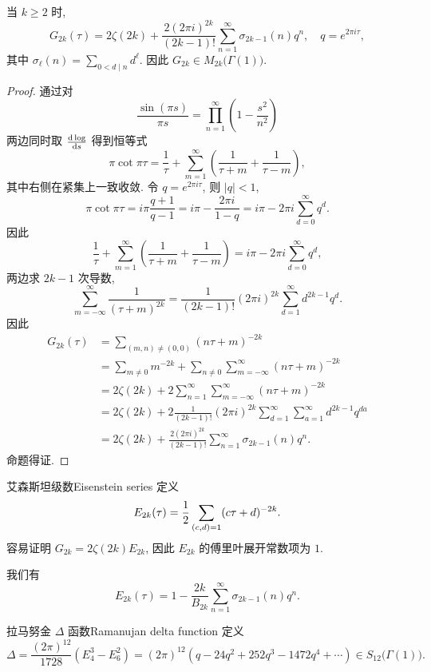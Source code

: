 \begin{proposition}{}{}
当 $k\ge 2$ 时, 
  \[G_{2k}(\tau)=2\zeta(2k)+\frac{2(2\pi i)^{2k}}{(2k-1)!}\sum_{n=1}^\infty \sigma_{2k-1}(n)q^n,\quad q=e^{2\pi i \tau},\]
其中 $\sigma_\ell(n)=\sum_{0<d\mid n}d^\ell$. 因此 $G_{2k}\in M_{2k}\bigl(\Gamma(1)\bigr)$.
\end{proposition}
\begin{proof}
通过对
  \[\frac{\sin(\pi s)}{\pi s}=\prod_{n=1}^\infty\left(1-\frac{s^2}{n^2}\right)\]
两边同时取 $\frac{\mathop{}\!\mathrm{d}\log}{\mathop{}\!\mathrm{d} s}$ 得到恒等式
  \[\pi\cot \pi \tau=\frac{1}{\tau}+\sum_{m=1}^\infty\left(\frac{1}{\tau+m}+\frac{1}{\tau-m}\right),\]
其中右侧在紧集上一致收敛. 令 $q=e^{2\pi i \tau}$, 则 $|q|<1$,
  \[\pi\cot \pi\tau=i\pi\frac{q+1}{q-1}=i\pi-\frac{2\pi i }{1-q}=i \pi-2\pi i \sum_{d=0}^\infty q^d.\]
因此
  \[\frac{1}{\tau}+\sum_{m=1}^\infty\left(\frac{1}{\tau+m}+\frac{1}{\tau-m}\right)=i \pi-2\pi i \sum_{d=0}^\infty q^d,\]
两边求 $2k-1$ 次导数,
  \[\sum_{m=-\infty}^\infty\frac{1}{(\tau+m)^{2k}}=\frac{1}{(2k-1)!}(2\pi i)^{2k} \sum_{d=1}^\infty d^{2k-1}q^d.\]
因此
  \[\begin{split}
  G_{2k}(\tau)&=\sum_{(m,n)\neq (0,0)}(n\tau+m)^{-2k}\\
    &=\sum_{m\neq 0}m^{-2k}+\sum_{n\neq 0}\sum_{m=-\infty}^{\infty}(n\tau+m)^{-2k}\\
    &=2\zeta(2k)+2\sum_{n=1}^\infty\sum_{m=-\infty}^{\infty}(n\tau+m)^{-2k}\\
    &=2\zeta(2k)+2\frac{1}{(2k-1)!}(2\pi i )^{2k}\sum_{d=1}^\infty\sum_{a=1}^{\infty}d^{2k-1}q^{da}\\
    &=2\zeta(2k)+\frac{2(2\pi i)^{2k}}{(2k-1)!}\sum_{n=1}^\infty \sigma_{2k-1}(n)q^n.
  \end{split}\]
命题得证.
\end{proof}

\begin{definition}{艾森斯坦级数}{Eisenstein series}
定义
  \[E_{2k}(\tau)=\frac{1}{2}\sum_{(c,d)=1}(c\tau+d)^{-2k}.\]
容易证明 $G_{2k}=2\zeta(2k)E_{2k}$, 因此 $E_{2k}$ 的傅里叶展开常数项为 $1$.
\end{definition}

\begin{proposition}{}{}
我们有 
  \[E_{2k}(\tau)=1-\frac{2k}{B_{2k}}\sum_{n=1}^\infty\sigma_{2k-1}(n)q^n.\]
\end{proposition}

\begin{definition}{拉马努金 $\Delta$ 函数}{Ramanujan delta function}
定义
  \[\Delta=\frac{(2\pi)^{12}}{1728}(E_4^3-E_6^2)=(2\pi)^{12}(q-24q^2+252q^3-1472q^4+\cdots)\in S_{12}\bigl(\Gamma(1)\bigr).\]
\end{definition}

